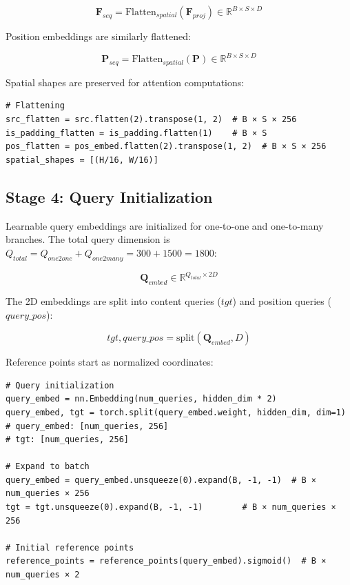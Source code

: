 \documentclass[12pt,a4paper]{article}
\newcommand{\B}[1]{\mathbf{#1}}
\begin{document}
\begin{equation}
\B{F}_{seq} = \text{Flatten}_{spatial}(\B{F}_{proj}) \in \mathbb{R}^{B \times S \times D}
\end{equation}

Position embeddings are similarly flattened:

\begin{equation}
\B{P}_{seq} = \text{Flatten}_{spatial}(\B{P}) \in \mathbb{R}^{B \times S \times D}
\end{equation}

Spatial shapes are preserved for attention computations:

\begin{verbatim}
# Flattening
src_flatten = src.flatten(2).transpose(1, 2)  # B × S × 256
is_padding_flatten = is_padding.flatten(1)    # B × S
pos_flatten = pos_embed.flatten(2).transpose(1, 2)  # B × S × 256
spatial_shapes = [(H/16, W/16)]
\end{verbatim}

\subsection{Stage 4: Query Initialization}

Learnable query embeddings are initialized for one-to-one and one-to-many branches. The total query dimension is $Q_{total} = Q_{one2one} + Q_{one2many} = 300 + 1500 = 1800$:

\begin{equation}
\B{Q}_{embed} \in \mathbb{R}^{Q_{total} \times 2D}
\end{equation}

The 2D embeddings are split into content queries ($tgt$) and position queries ($query\_pos$):

\begin{equation}
tgt, query\_pos = \text{split}(\B{Q}_{embed}, D)
\end{equation}

Reference points start as normalized coordinates:

\begin{verbatim}
# Query initialization
query_embed = nn.Embedding(num_queries, hidden_dim * 2)
query_embed, tgt = torch.split(query_embed.weight, hidden_dim, dim=1)
# query_embed: [num_queries, 256]
# tgt: [num_queries, 256]

# Expand to batch
query_embed = query_embed.unsqueeze(0).expand(B, -1, -1)  # B × num_queries × 256
tgt = tgt.unsqueeze(0).expand(B, -1, -1)        # B × num_queries × 256

# Initial reference points
reference_points = reference_points(query_embed).sigmoid()  # B × num_queries × 2
\end{verbatim}
\end{document}
